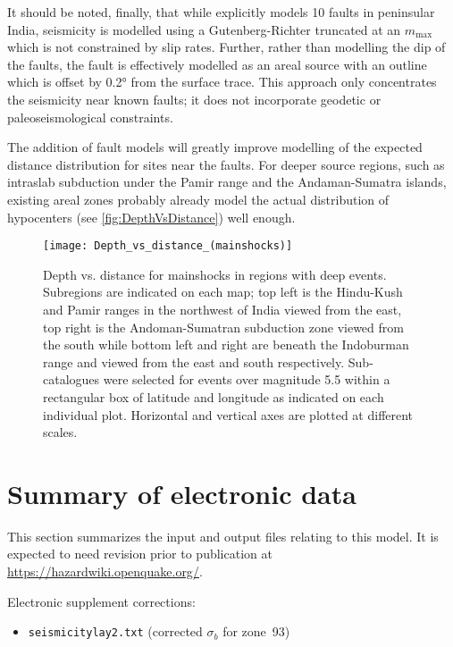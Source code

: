 \documentclass{article}
\begin{document}
\begin{appendices}
It should be noted, finally, that while \cite{ashish2016probabilistic} explicitly models 10 faults in peninsular India, seismicity is modelled using a Gutenberg-Richter truncated at an $m_\text{max}$ which is not constrained by slip rates. 
Further, rather than modelling the dip of the faults, the fault is effectively modelled as an areal source with an outline which is offset by 0.2° from the surface trace.
This approach only concentrates the seismicity near known faults; it does not incorporate geodetic or paleoseismological constraints.

The addition of fault models will greatly improve modelling of the expected distance distribution for sites near the faults.
For deeper source regions, such as intraslab subduction under the Pamir range and the Andaman-Sumatra islands, existing areal zones probably already model the actual distribution of hypocenters (see \autoref{fig:DepthVsDistance}) well enough.
\begin{figure}
\begin{adjustbox}{center}
\texttt{[image: Depth\_vs\_distance\_(mainshocks)]}
\end{adjustbox}
\caption[Depth vs. distance for mainshocks in regions with deep events]{%
Depth vs. distance for mainshocks in regions with deep events.
Subregions are indicated on each map; top left is the Hindu-Kush and Pamir ranges in the northwest of India viewed from the east, top right is the Andoman-Sumatran subduction zone viewed from the south while bottom left and right are beneath the Indoburman range and viewed from the east and south respectively.
Sub-catalogues were selected for events over magnitude 5.5 within a rectangular box of latitude and longitude as indicated on each individual plot.
 Horizontal and vertical axes are plotted at different scales.}
\label{fig:DepthVsDistance}
\end{figure}

\section{Summary of electronic data}
\label{app:Jobs}

This section summarizes the input and output files relating to this model. It is expected to need revision prior to publication at \url{https://hazardwiki.openquake.org/}.

Electronic supplement corrections:
\begin{itemize}
\item \texttt{seismicitylay2.txt} (corrected $\sigma_b$ for zone~93)
\end{itemize}


\end{appendices}
\end{document}
